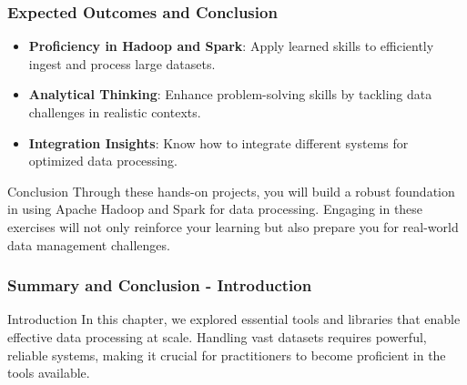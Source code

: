 \documentclass[aspectratio=169]{beamer}
\begin{document}
\begin{frame}[fragile]
    \frametitle{Expected Outcomes and Conclusion}
    \begin{itemize}
        \item \textbf{Proficiency in Hadoop and Spark}: Apply learned skills to efficiently ingest and process large datasets.
        \item \textbf{Analytical Thinking}: Enhance problem-solving skills by tackling data challenges in realistic contexts.
        \item \textbf{Integration Insights}: Know how to integrate different systems for optimized data processing.
    \end{itemize}
    \begin{block}{Conclusion}
        Through these hands-on projects, you will build a robust foundation in using Apache Hadoop and Spark for data processing. Engaging in these exercises will not only reinforce your learning but also prepare you for real-world data management challenges.
    \end{block}
\end{frame}

\begin{frame}[fragile]
    \frametitle{Summary and Conclusion - Introduction}
    \begin{block}{Introduction}
        In this chapter, we explored essential tools and libraries that enable effective data processing at scale. 
        Handling vast datasets requires powerful, reliable systems, making it crucial for practitioners to become proficient in the tools available.
    \end{block}
\end{frame}
\end{document}
